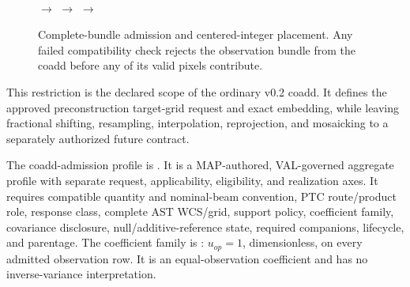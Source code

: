 \documentclass[10pt]{article}
\begin{document}
\begin{figure}[h]
\centering
\begin{minipage}[c]{0.18\linewidth}\centering
{}\\[0.22em]
\end{minipage}
\hfill\(\longrightarrow\)\hfill
{}
\hfill\(\longrightarrow\)\hfill
{}
\hfill\(\longrightarrow\)\hfill
{}
\caption{Complete-bundle admission and centered-integer placement. Any failed compatibility check rejects the observation bundle from the coadd before any of its valid pixels contribute.}
\label{fig:coadd}
\end{figure}

This restriction is the declared scope of the ordinary v0.2 coadd. It defines
the approved preconstruction target-grid request and exact embedding, while
leaving fractional shifting, resampling, interpolation, reprojection, and
mosaicking to a separately authorized future contract.

The coadd-admission profile is
\SCIMapCoaddProfile. It is a MAP-authored,
VAL-governed aggregate profile with separate request, applicability,
eligibility, and realization axes. It requires compatible quantity
and nominal-beam convention, PTC route/product role, response class, complete
AST WCS/grid, support policy, coefficient family, covariance disclosure,
null/additive-reference state, required companions, lifecycle, and parentage.
The coefficient family is
\SCIMapUniformCoaddProfile: \(u_{op}=1\),
dimensionless, on every admitted observation row. It is an equal-observation
coefficient and has no inverse-variance interpretation.
\end{document}

